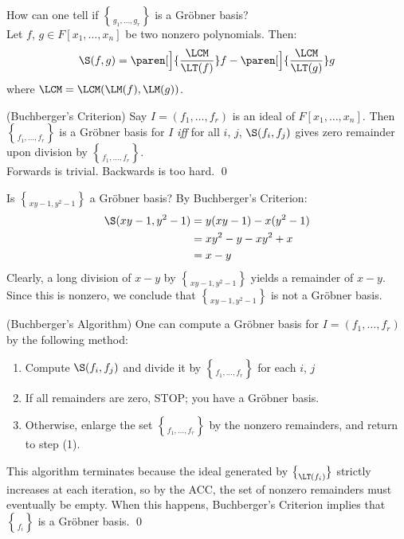 How can one tell if $\brace{g_1,\dotsc,g_r}$ is a Gr\"obner basis? \\
 Let $f$, $g\in F[x_1,\dotsc,x_n]$ be two nonzero polynomials.  Then:
\[ \S(f,g) = \paren[\Big]{\frac{\LCM}{\LT(f)}}f-\paren[\Big]{\frac{\LCM}{\LT(g)}}g \]
where $\LCM=\LCM(\LM(f),\LM(g))$.

\thm (Buchberger's Criterion) Say $I=(f_1,\dotsc,f_r)$ is an ideal of $F[x_1,\dotsc,x_n]$.  Then $\brace{f_1,\dotsc,f_r}$ is a Gr\"obner basis for $I$ \emph{iff} for all $i$, $j$, $\S(f_i,f_j)$ gives zero remainder upon division by $\brace{f_1,\dotsc,f_r}$. \\
\pf Forwards is trivial.  Backwards is too hard. \qed

\eg Is $\brace{xy-1,y^2-1}$ a Gr\"obner basis?  By Buchberger's Criterion:
\begin{align*}
\S(xy-1,y^2-1) &= y(xy-1)-x(y^2-1) \\
&= xy^2-y-xy^2+x \\
&= x-y
\end{align*}
Clearly, a long division of $x-y$ by $\brace{xy-1,y^2-1}$ yields a remainder of $x-y$.  Since this is nonzero, we conclude that $\brace{xy-1,y^2-1}$ is not a Gr\"obner basis.

\thm (Buchberger's Algorithm) One can compute a Gr\"obner basis for $I=(f_1,\dotsc,f_r)$ by the following method:
\begin{enumerate}[label=(\arabic*)]
\item Compute $\S(f_i,f_j)$ and divide it by $\brace{f_1,\dotsc,f_r}$ for each $i$, $j$
\item If all remainders are zero, STOP; you have a Gr\"obner basis.
\item Otherwise, enlarge the set $\brace{f_1,\dotsc,f_r}$ by the nonzero remainders, and return to step (1).
\end{enumerate}
\pf This algorithm terminates because the ideal generated by $\brace{\LT(f_i)}$ strictly increases at each iteration, so by the ACC, the set of nonzero remainders must eventually be empty.  When this happens, Buchberger's Criterion implies that $\brace{f_i}$ is a Gr\"obner basis. \qed

